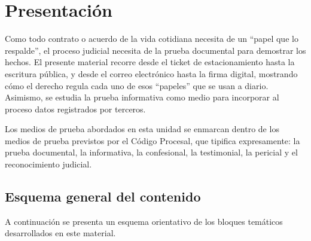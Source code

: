 \documentclass[12pt,oneside]{book}
\begin{document}
\chapter*{Presentación}

Como todo contrato o acuerdo de la vida cotidiana necesita de un ``papel que lo respalde'', el proceso judicial necesita de la prueba documental para demostrar los hechos. El presente material recorre desde el ticket de estacionamiento hasta la escritura pública, y desde el correo electrónico hasta la firma digital, mostrando cómo el derecho regula cada uno de esos ``papeles'' que se usan a diario. Asimismo, se estudia la prueba informativa como medio para incorporar al proceso datos registrados por terceros.

Los medios de prueba abordados en esta unidad se enmarcan dentro de los medios de prueba previstos por el Código Procesal, que tipifica expresamente: la prueba documental, la informativa, la confesional, la testimonial, la pericial y el reconocimiento judicial.

\section*{Esquema general del contenido}

A continuación se presenta un esquema orientativo de los bloques temáticos desarrollados en este material.
\end{document}
